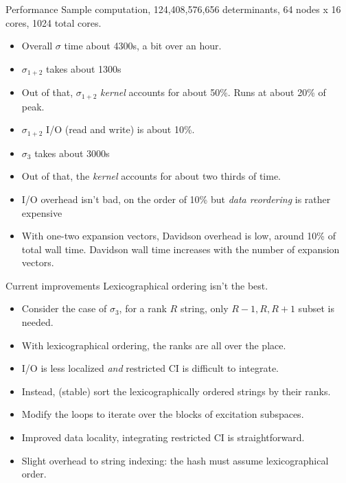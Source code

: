 \documentclass{beamer}
\begin{document}
\begin{frame}[fragile]{Performance}
Sample computation, 124,408,576,656 determinants, 64 nodes x 16 cores, 1024 total cores.
\begin{itemize}
\item Overall $\sigma$ time about 4300s, a bit over an hour.
\item $\sigma_{1+2}$ takes about 1300s
\item Out of that, $\sigma_{1+2}$ {\em kernel} accounts for about 50\%. Runs at about 20\% of peak.
\item $\sigma_{1+2}$ I/O (read and write) is about 10\%.
\item $\sigma_{3}$ takes about 3000s
\item Out of that, the {\em kernel} accounts for about two thirds of time.
\item I/O overhead isn't bad, on the order of 10\% but {\em data reordering} is rather expensive
\item With one-two expansion vectors, Davidson overhead is low, around 10\% of total wall time.
  Davidson wall time increases with the number of expansion vectors.
\end{itemize}
\end{frame}


\begin{frame}[fragile]{Current improvements}
Lexicographical ordering isn't the best.
\begin{itemize}
\item Consider the case of $\sigma_3$, for a rank $R$ string, only $R-1, R, R+1$ subset is needed.
\item With lexicographical ordering, the ranks are all over the place.
\item I/O is less localized {\em and} restricted CI is difficult to integrate.
\item Instead, (stable) sort the lexicographically ordered strings by their ranks.
\item Modify the loops to iterate over the blocks of excitation subspaces.
\item Improved data locality, integrating restricted CI is straightforward.
\item Slight overhead to string indexing:  the hash must assume lexicographical order.
\end{itemize}
\end{frame}
\end{document}
